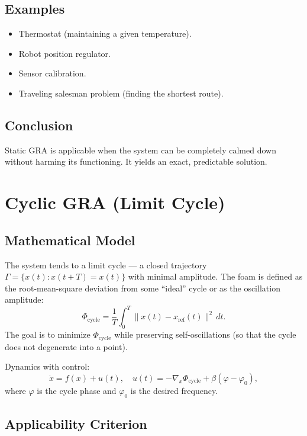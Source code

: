 \documentclass[12pt,a4paper]{article}
\begin{document}
\subsection{Examples}
\begin{itemize}
    \item Thermostat (maintaining a given temperature).
    \item Robot position regulator.
    \item Sensor calibration.
    \item Traveling salesman problem (finding the shortest route).
\end{itemize}

\subsection{Conclusion}
Static GRA is applicable when the system can be completely calmed down without harming its functioning. It yields an exact, predictable solution.

\section{Cyclic GRA (Limit Cycle)}
\label{sec:cyclic}

\subsection{Mathematical Model}

The system tends to a limit cycle — a closed trajectory $\Gamma = \{x(t): x(t+T) = x(t)\}$ with minimal amplitude. The foam is defined as the root-mean-square deviation from some ``ideal'' cycle or as the oscillation amplitude:
\begin{equation}
    \Phi_{\text{cycle}} = \frac{1}{T} \int_0^T \| x(t) - x_{\text{ref}}(t) \|^2 \, dt.
\end{equation}
The goal is to minimize $\Phi_{\text{cycle}}$ while preserving self-oscillations (so that the cycle does not degenerate into a point).

Dynamics with control:
\begin{equation}
    \dot{x} = f(x) + u(t), \quad u(t) = -\nabla_x \Phi_{\text{cycle}} + \beta (\varphi - \varphi_0),
\end{equation}
where $\varphi$ is the cycle phase and $\varphi_0$ is the desired frequency.

\subsection{Applicability Criterion}
\end{document}

